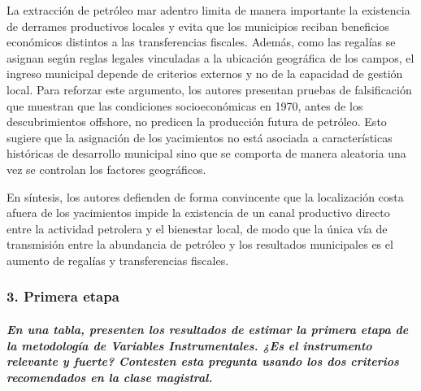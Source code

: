 \documentclass[
]{article}
\begin{document}
La extracción de petróleo mar adentro limita de manera importante la
existencia de derrames productivos locales y evita que los municipios
reciban beneficios económicos distintos a las transferencias fiscales.
Además, como las regalías se asignan según reglas legales vinculadas a
la ubicación geográfica de los campos, el ingreso municipal depende de
criterios externos y no de la capacidad de gestión local. Para reforzar
este argumento, los autores presentan pruebas de falsificación que
muestran que las condiciones socioeconómicas en 1970, antes de los
descubrimientos offshore, no predicen la producción futura de petróleo.
Esto sugiere que la asignación de los yacimientos no está asociada a
características históricas de desarrollo municipal sino que se comporta
de manera aleatoria una vez se controlan los factores geográficos.

En síntesis, los autores defienden de forma convincente que la
localización costa afuera de los yacimientos impide la existencia de un
canal productivo directo entre la actividad petrolera y el bienestar
local, de modo que la única vía de transmisión entre la abundancia de
petróleo y los resultados municipales es el aumento de regalías y
transferencias fiscales.

\subsubsection{3. Primera etapa}\label{primera-etapa}

\subparagraph{En una tabla, presenten los resultados de estimar la
primera etapa de la metodología de Variables Instrumentales. ¿Es el
instrumento relevante y fuerte? Contesten esta pregunta usando los dos
criterios recomendados en la clase
magistral.}\label{en-una-tabla-presenten-los-resultados-de-estimar-la-primera-etapa-de-la-metodologuxeda-de-variables-instrumentales.-es-el-instrumento-relevante-y-fuerte-contesten-esta-pregunta-usando-los-dos-criterios-recomendados-en-la-clase-magistral.}
\end{document}
